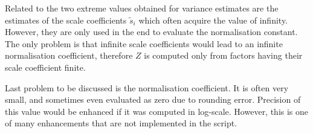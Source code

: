 \documentclass[11pt]{article}
\begin{document}
Related to the two extreme values obtained for variance estimates are the 
estimates of the scale coefficients $\tilde{s}_i$ which often acquire the 
value of infinity. However, they are only used in the end to evaluate the 
normalisation constant. The only problem is that infinite scale 
coefficients would lead to an infinite normalisation coefficient, therefore 
$Z$ is computed only from factors having their scale coefficient finite.

Last problem to be discussed is the normalisation coefficient. It is often 
very small, and sometimes even evaluated as zero due to rounding error.  
Precision of this value would be enhanced if it was computed in log-scale.  
However, this is one of many enhancements that are not implemented in the 
script.




\end{document}
